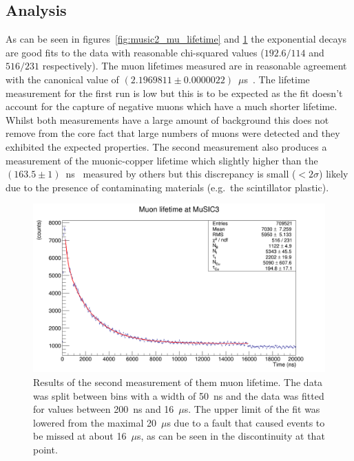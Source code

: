 \subsection{Analysis} %
\label{sec:analysis}
As can be seen in figures~\ref{fig:music2_mu_lifetime} and \ref{fig:music3_muon_lifetime} the exponential decays are good fits to the data with reasonable chi-squared values (\(192.6/114\) and \( 516/231 \) respectively). The muon lifetimes measured are in reasonable agreement with the canonical value of \((2.1969811\pm0.0000022)\)~\(\mu\)s~\cite{pdg}. The lifetime measurement for the first run is low but this is to be expected as the fit doesn't account for the capture of negative muons which have a much shorter lifetime. Whilst both measurements have a large amount of background this does not remove from the core fact that large numbers of muons were detected and they exhibited the expected properties. The second measurement also produces a measurement of the muonic-copper lifetime which slightly higher than the \((163.5\pm1)\)~ns~\cite{suzuki_mu_capture_rates} measured by others but this discrepancy is small (\(<2\sigma\)) likely due to the presence of contaminating materials (e.g.\ the scintillator plastic).

\begin{figure}[hptb]
  \centering
  \includegraphics[width=.9\textwidth]{images/lifetime/music3_muon_lifetime.png}
  \caption{Results of the second measurement of them muon lifetime. The data was split between bins with a width of 50~ns and the data was fitted for values between 200~ns and 16~\(\mu\)s. The upper limit of the fit was lowered from the maximal 20~\(\mu\)s due to a fault that caused events to be missed at about 16~\(\mu\)s, as can be seen in the discontinuity at that point.}
  \label{fig:music3_muon_lifetime}
\end{figure}

